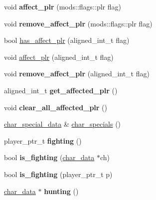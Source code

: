 \begin{DoxyCompactItemize}
void {\bfseries affect\+\_\+plr} (mods\+::flags\+::plr flag)
\item 
\mbox{\label{classmods_1_1player_af7805037a2d455dee15ad5f7ae30a3ee}} 
void {\bfseries remove\+\_\+affect\+\_\+plr} (mods\+::flags\+::plr flag)
\item 
bool \hyperlink{classmods_1_1player_ae07901c25cbe93b8c259720f1662e5d3}{has\+\_\+affect\+\_\+plr} (aligned\+\_\+int\+\_\+t flag)
\item 
void \hyperlink{classmods_1_1player_acd374d4b3b772201c0ec8611fbbc9c4a}{affect\+\_\+plr} (aligned\+\_\+int\+\_\+t flag)
\item 
\mbox{\label{classmods_1_1player_a13bddf9d9e26c4a1c486f20e3b863eb3}} 
void {\bfseries remove\+\_\+affect\+\_\+plr} (aligned\+\_\+int\+\_\+t flag)
\item 
\mbox{\label{classmods_1_1player_a0431c2804168d8641764c13ca202b82b}} 
aligned\+\_\+int\+\_\+t {\bfseries get\+\_\+affected\+\_\+plr} ()
\item 
\mbox{\label{classmods_1_1player_ac969608261f9794513b2719f7804db59}} 
void {\bfseries clear\+\_\+all\+\_\+affected\+\_\+plr} ()
\item 
\hyperlink{structchar__special__data}{char\+\_\+special\+\_\+data} \& \hyperlink{classmods_1_1player_af85ed0368fd327f3747b4d1e6572cccc}{char\+\_\+specials} ()
\item 
\mbox{\label{classmods_1_1player_aed046739ae34b5b39fdc315267809265}} 
player\+\_\+ptr\+\_\+t {\bfseries fighting} ()
\item 
\mbox{\label{classmods_1_1player_a5390344e407af0c1b9f1d3cff0a42eca}} 
bool {\bfseries is\+\_\+fighting} (\hyperlink{structchar__data}{char\+\_\+data} $\ast$ch)
\item 
\mbox{\label{classmods_1_1player_a6452aee5f0b0387bb872c9c064d8a178}} 
bool {\bfseries is\+\_\+fighting} (player\+\_\+ptr\+\_\+t p)
\item 
\mbox{\label{classmods_1_1player_a00396f35074226bf84a0bbc8398da39b}} 
\hyperlink{structchar__data}{char\+\_\+data} $\ast$ {\bfseries hunting} ()

\end{DoxyCompactItemize}
